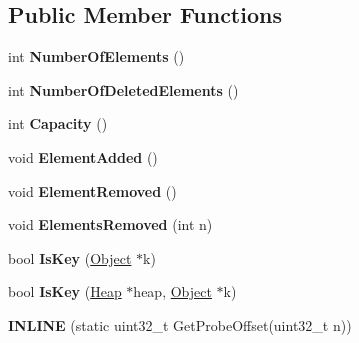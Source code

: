 \subsection*{Public Member Functions}
\begin{DoxyCompactItemize}
\item 
int {\bfseries Number\+Of\+Elements} ()\hypertarget{classv8_1_1internal_1_1_hash_table_base_a846ebfb321ea4da7bb1ddf173e9abe58}{}\label{classv8_1_1internal_1_1_hash_table_base_a846ebfb321ea4da7bb1ddf173e9abe58}

\item 
int {\bfseries Number\+Of\+Deleted\+Elements} ()\hypertarget{classv8_1_1internal_1_1_hash_table_base_a2b2341dea9521feca8718fbf250d67ce}{}\label{classv8_1_1internal_1_1_hash_table_base_a2b2341dea9521feca8718fbf250d67ce}

\item 
int {\bfseries Capacity} ()\hypertarget{classv8_1_1internal_1_1_hash_table_base_a53d34a718d3a1ac35bbf599830f141ea}{}\label{classv8_1_1internal_1_1_hash_table_base_a53d34a718d3a1ac35bbf599830f141ea}

\item 
void {\bfseries Element\+Added} ()\hypertarget{classv8_1_1internal_1_1_hash_table_base_a9c26053696a9507a6548c562de31896e}{}\label{classv8_1_1internal_1_1_hash_table_base_a9c26053696a9507a6548c562de31896e}

\item 
void {\bfseries Element\+Removed} ()\hypertarget{classv8_1_1internal_1_1_hash_table_base_a60cec5ab24abcb14a08c59e6abf33aaf}{}\label{classv8_1_1internal_1_1_hash_table_base_a60cec5ab24abcb14a08c59e6abf33aaf}

\item 
void {\bfseries Elements\+Removed} (int n)\hypertarget{classv8_1_1internal_1_1_hash_table_base_a0f5cbf8c5beece520200339ea79521c4}{}\label{classv8_1_1internal_1_1_hash_table_base_a0f5cbf8c5beece520200339ea79521c4}

\item 
bool {\bfseries Is\+Key} (\hyperlink{classv8_1_1internal_1_1_object}{Object} $\ast$k)\hypertarget{classv8_1_1internal_1_1_hash_table_base_a6f8b087729eaa43aa7ab7b80b34fb04c}{}\label{classv8_1_1internal_1_1_hash_table_base_a6f8b087729eaa43aa7ab7b80b34fb04c}

\item 
bool {\bfseries Is\+Key} (\hyperlink{classv8_1_1internal_1_1_heap}{Heap} $\ast$heap, \hyperlink{classv8_1_1internal_1_1_object}{Object} $\ast$k)\hypertarget{classv8_1_1internal_1_1_hash_table_base_a5fb295c7eb167a4f326c4906b6a2ff6a}{}\label{classv8_1_1internal_1_1_hash_table_base_a5fb295c7eb167a4f326c4906b6a2ff6a}

\item 
{\bfseries I\+N\+L\+I\+NE} (static uint32\+\_\+t Get\+Probe\+Offset(uint32\+\_\+t n))\hypertarget{classv8_1_1internal_1_1_hash_table_base_a83c70214a69a92aa7ea2a88db364dd1a}{}\label{classv8_1_1internal_1_1_hash_table_base_a83c70214a69a92aa7ea2a88db364dd1a}

\end{DoxyCompactItemize}
